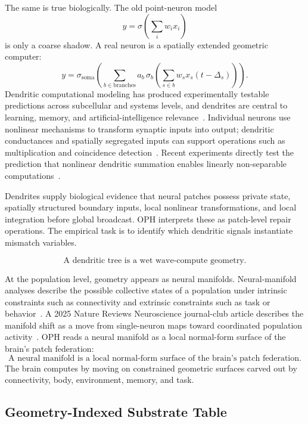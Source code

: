 \documentclass[11pt]{article}
\theoremstyle{remark}
\theoremstyle{plain}
\begin{document}
The same is true biologically. The old point-neuron model
\[
y=\sigma\!\left(\sum_i w_i x_i\right)
\]
is only a coarse shadow. A real neuron is a spatially extended geometric computer:
\[
y
=
\sigma_{\mathrm{soma}}
\left(
\sum_{b\in\mathrm{branches}}
a_b\,
\sigma_b
\left(
\sum_{s\in b}
w_s x_s(t-\Delta_s)
\right)
\right).
\]
Dendritic computational modeling has produced experimentally testable predictions across subcellular and systems levels, and dendrites are central to learning, memory, and artificial-intelligence relevance~\cite{PoiraziPapoutsi2020}. Individual neurons use nonlinear mechanisms to transform synaptic inputs into output; dendritic conductances and spatially segregated inputs can support operations such as multiplication and coincidence detection~\cite{Silver2010}. Recent experiments directly test the prediction that nonlinear dendritic summation enables linearly non-separable computations~\cite{Caze2024}.

Dendrites supply biological evidence that neural patches possess private state, spatially structured boundary inputs, local nonlinear transformations, and local integration before global broadcast. OPH interprets these as patch-level repair operations. The empirical task is to identify which dendritic signals instantiate mismatch variables.

\[
\boxed{
\text{A dendritic tree is a wet wave-compute geometry.}
}
\]

At the population level, geometry appears as neural manifolds. Neural-manifold analyses describe the possible collective states of a population under intrinsic constraints such as connectivity and extrinsic constraints such as task or behavior~\cite{Perich2025}. A 2025 Nature Reviews Neuroscience journal-club article describes the manifold shift as a move from single-neuron maps toward coordinated population activity~\cite{Gallego2025Manifolds}. OPH reads a neural manifold as a local normal-form surface of the brain's patch federation:
\[
\boxed{
\text{A neural manifold is a local normal-form surface of the brain's patch federation.}
}
\]
The brain computes by moving on constrained geometric surfaces carved out by connectivity, body, environment, memory, and task.

\subsection{Geometry-Indexed Substrate Table}
\end{document}
